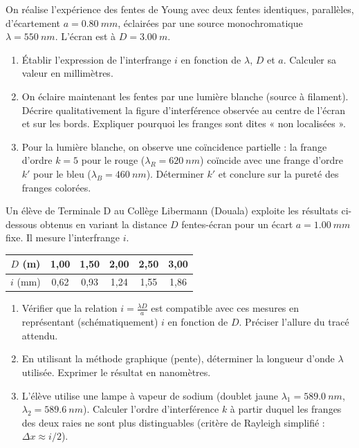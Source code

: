 \documentclass[11pt]{article}
\begin{document}
\begin{exercice}
On réalise l'expérience des fentes de Young avec deux fentes identiques, parallèles, d'écartement $a = \SI{0,80}{mm}$, éclairées par une source monochromatique $\lambda = \SI{550}{nm}$. L'écran est à $D = \SI{3,00}{m}$.
\begin{enumerate}
    \item Établir l'expression de l'interfrange $i$ en fonction de $\lambda$, $D$ et $a$. Calculer sa valeur en millimètres.
    \item On éclaire maintenant les fentes par une lumière blanche (source à filament). Décrire qualitativement la figure d'interférence observée au centre de l'écran et sur les bords. Expliquer pourquoi les franges sont dites « non localisées ».
    \item Pour la lumière blanche, on observe une coïncidence partielle : la frange d'ordre $k=5$ pour le rouge ($\lambda_R = \SI{620}{nm}$) coïncide avec une frange d'ordre $k'$ pour le bleu ($\lambda_B = \SI{460}{nm}$). Déterminer $k'$ et conclure sur la pureté des franges colorées.
\end{enumerate}
\end{exercice}

\begin{exercice}
Un élève de Terminale D au Collège Libermann (Douala) exploite les résultats ci-dessous obtenus en variant la distance $D$ fentes-écran pour un écart $a = \SI{1,00}{mm}$ fixe. Il mesure l'interfrange $i$.
\begin{center}
\begin{tabular}{|c|c|c|c|c|c|}
\hline
$D$ (\si{m}) & 1,00 & 1,50 & 2,00 & 2,50 & 3,00 \\
\hline
$i$ (\si{mm}) & 0,62 & 0,93 & 1,24 & 1,55 & 1,86 \\
\hline
\end{tabular}
\end{center}
\begin{enumerate}
    \item Vérifier que la relation $i = \frac{\lambda D}{a}$ est compatible avec ces mesures en représentant (schématiquement) $i$ en fonction de $D$. Préciser l'allure du tracé attendu.
    \item En utilisant la méthode graphique (pente), déterminer la longueur d'onde $\lambda$ utilisée. Exprimer le résultat en nanomètres.
    \item L'élève utilise une lampe à vapeur de sodium (doublet jaune $\lambda_1 = \SI{589,0}{nm}$, $\lambda_2 = \SI{589,6}{nm}$). Calculer l'ordre d'interférence $k$ à partir duquel les franges des deux raies ne sont plus distinguables (critère de Rayleigh simplifié : $\Delta x \approx i/2$).
\end{enumerate}
\end{exercice}
\end{document}
